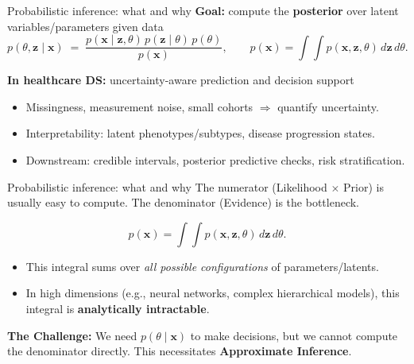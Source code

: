 \documentclass[aspectratio=169]{beamer}
\begin{document}
\begin{frame}{Probabilistic inference: what and why}
  \textbf{Goal:} compute the \textbf{posterior} over latent variables/parameters given data
  \[
    p(\theta, \bm{z}\mid \bm{x})
    \;=\;
    \frac{p(\bm{x}\mid \bm{z},\theta)\,p(\bm{z}\mid \theta)\,p(\theta)}
         {p(\bm{x})},
    \qquad
    p(\bm{x})=\int\!\!\int p(\bm{x},\bm{z},\theta)\,d\bm{z}\,d\theta.
  \]

  \vspace{0.4em}
  \textbf{In healthcare DS:} uncertainty-aware prediction and decision support
  \begin{itemize}
    \item Missingness, measurement noise, small cohorts $\Rightarrow$ quantify uncertainty.
    \item Interpretability: latent phenotypes/subtypes, disease progression states.
    \item Downstream: credible intervals, posterior predictive checks, risk stratification.
  \end{itemize}
\end{frame}

\begin{frame}{Probabilistic inference: what and why}
  The numerator (Likelihood $\times$ Prior) is usually easy to compute.
  The denominator (Evidence) is the bottleneck.

  \[
    p(\bm{x})=\int\!\!\int p(\bm{x},\bm{z},\theta)\,d\bm{z}\,d\theta.
  \]

  \begin{itemize}
    \item This integral sums over \emph{all possible configurations} of parameters/latents.
    \item In high dimensions (e.g., neural networks, complex hierarchical models), this integral is \textbf{analytically intractable}.
  \end{itemize}

  \vspace{0.4em}
  \textbf{The Challenge:} We need $p(\theta \mid \bm{x})$ to make decisions, but we cannot compute the denominator directly. This necessitates \textbf{Approximate Inference}.
\end{frame}


\end{document}
